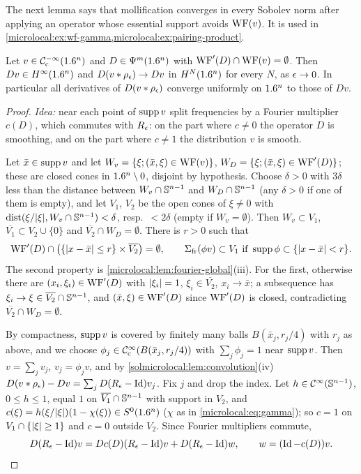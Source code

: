 The next lemma says that mollification converges in every Sobolev norm after applying an
operator whose essential support avoids $\operatorname{WF}(v)$. It is used in
\cref{microlocal:ex:wf-gamma,microlocal:ex:pairing-product}.

\begin{lemma}\label{solmicrolocal:lem:mollify}
  Let $v\in\mathcal{C}^{-\infty}_{\mathrm{c}}(1.6^n)$ and $D\in\Psi^{m}(1.6^n)$ with $\operatorname{WF}'(D)\cap\operatorname{WF}(v)=\emptyset$. Then
  $Dv\in H^\infty(1.6^n)$ and $D(v*\rho_\epsilon)\to Dv$ in $H^N(1.6^n)$ for every $N$, as
  $\epsilon\to0$. In particular all derivatives of $D(v*\rho_\epsilon)$ converge uniformly on $1.6^n$ to
  those of $Dv$.
\end{lemma}
\begin{proof}
  \emph{Idea:} near each point of $\operatorname{supp} v$ split frequencies by a Fourier multiplier $c(D)$,
  which commutes with $R_\epsilon$: on the part where $c\ne0$ the operator $D$ is smoothing, and on
  the part where $c\ne1$ the distribution $v$ is smooth.

  Let $\bar x\in\operatorname{supp} v$ and let $W_v=\{\xi;(\bar x,\xi)\in\operatorname{WF}(v)\}$,
  $W_D=\{\xi;(\bar x,\xi)\in\operatorname{WF}'(D)\}$; these are closed cones in $1.6^n\setminus0$, disjoint by
  hypothesis. Choose $\delta>0$ with $3\delta$ less than the distance between
  $W_v\cap\mathbb{S}^{n-1}$ and $W_D\cap\mathbb{S}^{n-1}$ (any $\delta>0$ if one of them is empty),
  and let $V_1$, $V_2$ be the open cones of $\xi\ne0$ with
  $\operatorname{dist}(\xi/\lvert \xi\rvert,W_v\cap\mathbb{S}^{n-1})<\delta$, resp.\ $<2\delta$ (empty if
  $W_v=\emptyset$). Then $W_v\subset V_1$, $\overline{V_1}\subset V_2\cup\{0\}$ and
  $\overline{V_2}\cap W_D=\emptyset$. There is $r>0$ such that
  \begin{equation}\label{solmicrolocal:eq:r}
    \operatorname{WF}'(D)\cap\bigl(\{\lvert x-\bar x\rvert\le r\}\times\overline{V_2}\bigr)=\emptyset,\qquad
    \Sigma_{\mathrm{fr}}(\phi v)\subset V_1\text{ if }\operatorname{supp}\phi\subset\{\lvert x-\bar x\rvert<r\}.
  \end{equation}
  The second property is \cref{microlocal:lem:fourier-global}(iii). For the first, otherwise
  there are $(x_i,\xi_i)\in\operatorname{WF}'(D)$ with $\lvert \xi_i\rvert=1$, $\xi_i\in\overline{V_2}$, $x_i\to\bar x$;
  a subsequence has $\xi_i\to\xi\in\overline{V_2}\cap\mathbb{S}^{n-1}$, and $(\bar x,\xi)\in\operatorname{WF}'(D)$
  since $\operatorname{WF}'(D)$ is closed, contradicting $\overline{V_2}\cap W_D=\emptyset$.

  By compactness, $\operatorname{supp} v$ is covered by finitely many balls $B(\bar x_j,r_j/4)$ with $r_j$ as
  above, and we choose $\phi_j\in\mathcal{C}^\infty_{\mathrm{c}}(B(\bar x_j,r_j/4))$ with $\sum_j\phi_j=1$ near $\operatorname{supp} v$. Then
  $v=\sum_jv_j$, $v_j=\phi_jv$, and by \cref{solmicrolocal:lem:convolution}(iv)
  $D(v*\rho_\epsilon)-Dv=\sum_jD(R_\epsilon-\operatorname{Id})v_j$. Fix $j$ and drop the index. Let
  $h\in\mathcal{C}^\infty(\mathbb{S}^{n-1})$, $0\le h\le1$, equal $1$ on $\overline{V_1}\cap\mathbb{S}^{n-1}$ with support in
  $V_2$, and $c(\xi)=h(\xi/\lvert \xi\rvert)(1-\chi(\xi))\in S^0(1.6^n)$ ($\chi$ as in
  \eqref{microlocal:eq:gamma}); so $c=1$ on $V_1\cap\{\lvert \xi\rvert\ge1\}$ and $c=0$ outside $V_2$. Since
  Fourier multipliers commute,
  \begin{equation*}
    D(R_\epsilon-\operatorname{Id})v=Dc(D)(R_\epsilon-\operatorname{Id})v+D(R_\epsilon-\operatorname{Id})w,\qquad w=(\operatorname{Id}-c(D))v.
  \end{equation*}


\end{proof}
